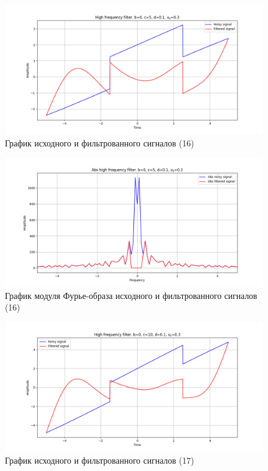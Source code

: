 \documentclass[a4paper, 12pt]{article}
\begin{document}
    \begin{figure}[!htb]
        \centering
        \includegraphics[scale=0.48]{16_u_flt_u_nolow.png}
        \captionsetup{skip=0pt}
        \caption{График исходного и фильтрованного сигналов (16)}
        \label{fig:fig57}
    \end{figure}
    \begin{figure}[!htb]
        \centering
        \includegraphics[scale=0.48]{16_abs_u_U_nolow.png}
        \captionsetup{skip=0pt}
        \caption{График модуля Фурье-образа исходного и фильтрованного сигналов (16)}
        \label{fig:fig58}
    \end{figure}
    \newpage
    \begin{figure}[!htb]
        \centering
        \includegraphics[scale=0.48]{17_u_flt_u_nolow.png}
        \captionsetup{skip=0pt}
        \caption{График исходного и фильтрованного сигналов (17)}
        \label{fig:fig59}
    \end{figure}
\end{document}
